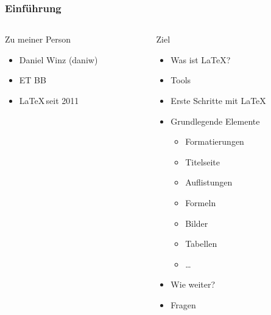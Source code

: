 \begin{frame}
    \frametitle{Einführung}
    \begin{columns}
        \begin{column}{0.50\textwidth}
            \begin{block}{Zu meiner Person}
                \begin{itemize}
                    \item Daniel Winz (daniw)
                    \item ET BB
                    \item \LaTeX \,seit 2011
                \end{itemize}
            \end{block}
        \end{column}
        \pause
        \begin{column}{0.50\textwidth}
            \begin{block}{Ziel}
                \begin{itemize}
                    \item Was ist \LaTeX?
                    \item Tools
                    \item Erste Schritte mit \LaTeX
                    \item Grundlegende Elemente
                    \begin{itemize}
                        \item Formatierungen
                        \item Titelseite
                        \item Auflistungen
                        \item Formeln
                        \item Bilder
                        \item Tabellen
                        \item \ldots
                    \end{itemize}
                    \item Wie weiter? 
                    \item Fragen
                \end{itemize}
            \end{block}
        \end{column}
    \end{columns}
\end{frame}
